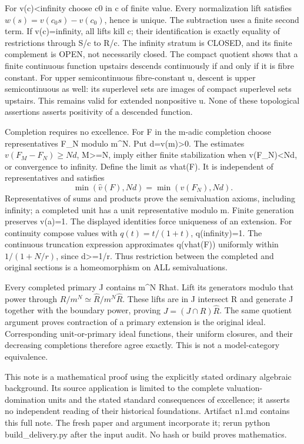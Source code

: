 \documentclass[11pt]{article}
\begin{document}
For v(c)<infinity choose c0 in c of finite value. Every normalization lift satisfies \(w(s)=v(c_0s)-v(c_0)\), hence is unique. The subtraction uses a finite second term. If v(c)=infinity, all lifts kill c; their identification is exactly equality of restrictions through S/c to R/c. The infinity stratum is CLOSED, and its finite complement is OPEN, not necessarily closed. The compact quotient shows that a finite continuous function upstairs descends continuously if and only if it is fibre constant. For upper semicontinuous fibre-constant u, descent is upper semicontinuous as well: its superlevel sets are images of compact superlevel sets upstairs. This remains valid for extended nonpositive u. None of these topological assertions asserts positivity of a descended function.

Completion requires no excellence. For F in the m-adic completion choose representatives F\_N modulo m\textasciicircum{}N. Put d=v(m)>0. The estimates \(v(F_M-F_N)\ge Nd\), M>=N, imply either finite stabilization when v(F\_N)<Nd, or convergence to infinity. Define the limit as vhat(F). It is independent of representatives and satisfies
\[
 \min(\widehat v(F),Nd)=\min(v(F_N),Nd).
\]
Representatives of sums and products prove the semivaluation axioms, including infinity; a completed unit has a unit representative modulo m. Finite generation preserves v(a)=1. The displayed identities force uniqueness of an extension. For continuity compose values with \(q(t)=t/(1+t)\), q(infinity)=1. The continuous truncation expression approximates q(vhat(F)) uniformly within \(1/(1+N/r)\), since d>=1/r. Thus restriction between the completed and original sections is a homeomorphism on ALL semivaluations.

Every completed primary J contains m\textasciicircum{}N Rhat. Lift its generators modulo that power through \(R/m^N\simeq\widehat R/m^N\widehat R\). These lifts are in J intersect R and generate J together with the boundary power, proving \(J=(J\cap R)\widehat R\). The same quotient argument proves contraction of a primary extension is the original ideal. Corresponding unit-or-primary ideal functions, their uniform closures, and their decreasing completions therefore agree exactly. This is not a model-category equivalence.

This note is a mathematical proof using the explicitly stated ordinary algebraic background. Its source application is limited to the complete valuation-domination units and the stated standard consequences of excellence; it asserts no independent reading of their historical foundations. Artifact n1.md contains this full note. The fresh paper and argument incorporate it; rerun python build\_delivery.py after the input audit. No hash or build proves mathematics.
\end{document}
